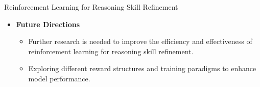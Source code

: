 \begin{frame}[allowframebreaks]{Reinforcement Learning for Reasoning Skill Refinement}
\begin{itemize}
\begin{itemize}
        \end{itemize}
        \item \textbf{Future Directions}
        \begin{itemize}
            \item Further research is needed to improve the efficiency and effectiveness of reinforcement learning for reasoning skill refinement.
            \item Exploring different reward structures and training paradigms to enhance model performance.
        \end{itemize}
    \end{itemize}
\end{frame}